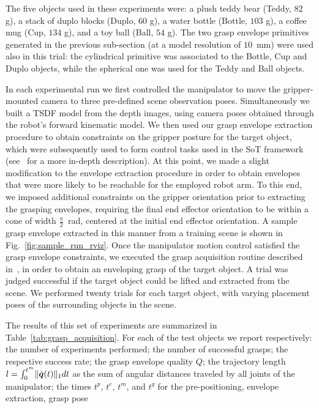 The five objects used in these experiments were: a plush teddy bear (Teddy, $82$ g), a stack of
duplo blocks (Duplo, $60$ g), a water bottle (Bottle, $103$ g), a coffee mug (Cup, $134$ g), and a
toy ball (Ball, $54$ g). The two grasp envelope primitives generated in the previous sub-section (at a model resolution of $10$~mm) were used also in this trial: the cylindrical primitive was associated to the Bottle, Cup and Duplo objects, while the spherical one was used for the Teddy and Ball objects. 
%
\par
In each experimental run we first controlled the manipulator to move the gripper-mounted camera to three pre-defined scene observation poses.
Simultaneously we built a TSDF model from the depth images, using camera poses obtained through the robot's forward kinematic model. 
We then used our grasp envelope extraction procedure to obtain constraints on the gripper posture
for the target object, which were subsequently used to form control tasks used in the SoT framework (see~\cite{Krug15} for a more in-depth description).
At this point, we made a slight modification to the envelope extraction procedure in order to obtain
envelopes that were more likely to be reachable for the employed robot arm. 
To this end, we imposed additional constraints on the gripper orientation prior to extracting the
grasping envelopes, requiring the final end effector orientation to be within a cone of width $\frac{\pi}{2}$~rad, centered at the initial end effector orientation.
A sample grasp envelope extracted in this manner from a training scene is shown in Fig.~\ref{fig:sample_run_rviz}.
Once the manipulator motion control satisfied the grasp envelope constraints, we executed the grasp
acquisition routine described in~\cite{Krug14a}, in order to obtain an enveloping grasp of the target object.
A trial was judged successful if the target object could be lifted and extracted from the scene. 
We performed twenty trials for each target object, with varying placement poses of the surrounding objects in the scene.
\par
The results of this set of experiments are summarized in Table~\ref{tab:grasp_acquisition}.
For each of the test objects we report respectively: 
the number of experiments performed; 
the number of successful grasps; 
the respective success rate; 
the grasp envelope quality $Q$; 
the trajectory length $l=\int_0^{t^m}\lVert\dot{\mbox{\boldmath $q$}}(t)\rVert_1dt$ as the sum of angular distances traveled by all joints of the manipulator; 
the times $t^p$, $t^e$, $t^m$, and $t^g$ for the pre-positioning, envelope extraction, grasp pose

